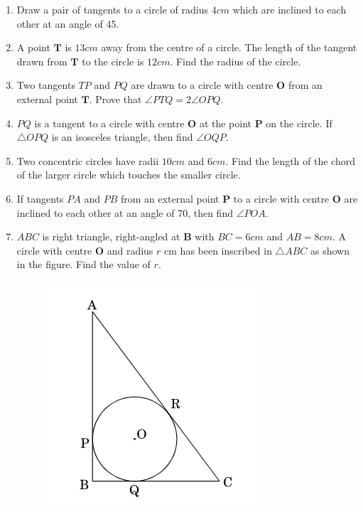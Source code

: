 \documentclass{article}
\let\vec\mathbf
\begin{document}
\begin{enumerate}
\begin{figure}[!htb]
		\caption{}
		\label{fig:circ-1}
	\end{figure}
	\item Draw a pair of tangents to a circle of radius $4 cm$ which are inclined to each other at an angle of 45\degree.	
	\item A point $\vec{T}$ is $13 cm$ away from the centre of a circle. The length of the tangent drawn from $\vec{T}$ to the circle is $12 cm$. Find the radius of the circle.
	\item Two tangents $TP$ and $PQ$ are drawn to a circle with centre $\vec{O}$ from an external point $\vec{T}$. Prove that $\angle PTQ = 2 \angle OPQ$.
	\item $PQ$ is a tangent to a circle with centre $\vec{O}$ at the point $\vec{P}$ on the circle. If $\triangle OPQ$ is an isosceles triangle, then find $\angle OQP$.
	\item Two concentric circles have radii $10 cm$ and $6 cm$. Find the length of the chord of the larger circle which touches the smaller circle.
	\item If tangents $PA$ and $PB$ from an external point $\vec{P}$ to a circle with centre $\vec{O}$ are inclined to each other at an angle of 70\degree, then find $\angle POA$.
	\item $ABC$ is right triangle, right-angled at $\vec{B}$ with $BC = 6 cm$ and $AB = 8 cm$. A circle with centre $\vec{O}$ and radius $r$ cm has been inscribed in $\triangle ABC$ as shown in the figure. Find the value of $r$.
		\begin{figure}[H]
			\centering
			\includegraphics[width=\columnwidth]{figs/circ-2.png}

\end{figure}
\end{enumerate}
\end{document}
